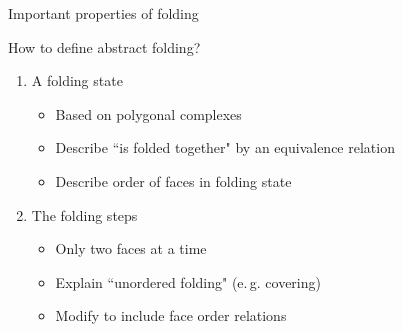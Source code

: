 \begin{frame}{Important properties of folding}
\begin{overlayarea}{\textwidth}{0.3\textwidth}
\begin{center}

        \end{center}
    \end{overlayarea}
\end{frame}


\begin{frame}{How to define abstract folding?}
    \begin{enumerate}
        \item<3-> A folding state
            \begin{itemize}
                \item<5-> Based on polygonal complexes
                \item<6-> Describe ``is folded together" by an equivalence relation
                \item<7-> Describe order of faces in folding state
            \end{itemize}
        \item<4-> The folding steps
            \begin{itemize}
                \item<8-> Only two faces at a time
                \item<9-> Explain ``unordered folding" (e.\,g. covering)
                \item<10-> Modify to include face order relations
            \end{itemize}
    \end{enumerate}
\end{frame}


